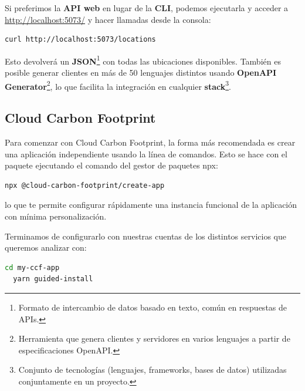\documentclass[12pt,a4paper]{report}
\begin{document}
Si preferimos la \textbf{API web} en
lugar de la \textbf{CLI}, podemos ejecutarla y
acceder a \href{http://localhost:5073}{http://localhost:5073/} y hacer llamadas
desde la consola:

\begin{tcolorbox}[colback=codebackground, colframe=codeborder, boxrule=0.8pt, arc=0mm, boxsep=5pt, left=5pt, right=5pt, top=5pt, bottom=5pt]
  \begin{lstlisting}[language=bash]
curl http://localhost:5073/locations
\end{lstlisting}
\end{tcolorbox}

Esto devolverá un \textbf{JSON}\footnote{Formato de intercambio de datos basado
  en texto, común en respuestas de APIs.} con todas las ubicaciones disponibles.
También es posible generar clientes en más de 50 lenguajes distintos usando
\textbf{OpenAPI Generator}\footnote{Herramienta que genera clientes y
  servidores en varios lenguajes a partir de especificaciones OpenAPI.}, lo que
facilita la integración en cualquier \textbf{stack}\footnote{Conjunto de
  tecnologías (lenguajes, frameworks, bases de datos) utilizadas conjuntamente en
  un proyecto.}.

\subsection{Cloud Carbon Footprint}
Para comenzar con Cloud Carbon Footprint, la forma más recomendada es crear una
aplicación independiente usando la línea de comandos. Esto se hace con el
paquete ejecutando el comando del gestor de paquetes npx:

\begin{tcolorbox}[colback=codebackground, colframe=codeborder, boxrule=0.8pt, arc=0mm, boxsep=5pt, left=5pt, right=5pt, top=5pt, bottom=5pt]
  \begin{lstlisting}[language=bash]
  npx @cloud-carbon-footprint/create-app
  \end{lstlisting}
\end{tcolorbox}

lo que te permite configurar rápidamente una instancia funcional de la
aplicación con mínima personalización.

Terminamos de configurarlo con nuestras cuentas de los distintos servicios que
queremos analizar con:

\begin{tcolorbox}[colback=codebackground, colframe=codeborder, boxrule=0.8pt, arc=0mm, boxsep=5pt, left=5pt, right=5pt, top=5pt, bottom=5pt]
  \begin{lstlisting}[language=bash]
  cd my-ccf-app
  yarn guided-install
  \end{lstlisting}
\end{tcolorbox}
\end{document}

